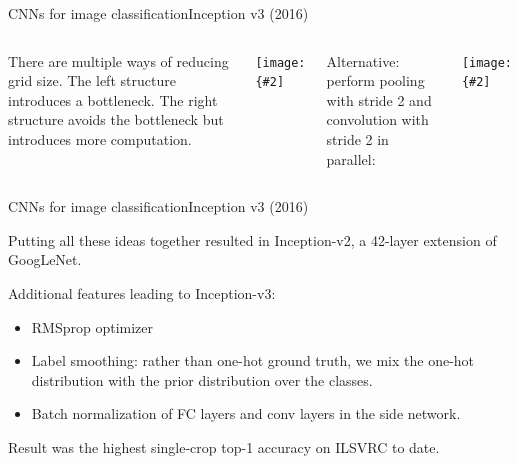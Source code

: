 \documentclass[aspectratio=169]{beamer}
\newcommand{\myfig}[3]{\centerline{\texttt{[image: \{\#2]}}}
\begin{document}
\begin{frame}{CNNs for image classification}{Inception v3 (2016)}

  \begin{columns}

  \column{2in}

  There are multiple ways of reducing grid size. The left structure
  introduces a bottleneck. The right structure avoids the bottleneck
  but introduces more computation.

  \medskip

  \myfig{1.8in}{szegedy-15-fig9}{Szegedy et al. (2016), Figure 9}

  \column{2in}

  Alternative: perform pooling with stride 2 and convolution with stride
  2 in parallel:

  \medskip

  \myfig{1.8in}{szegedy-15-fig10}{Szegedy et al. (2016), Figure 10}

  \end{columns}

\end{frame}


\begin{frame}{CNNs for image classification}{Inception v3 (2016)}

  Putting all these ideas together resulted in Inception-v2, a 42-layer
  extension of GoogLeNet.

  \medskip

  Additional features leading to Inception-v3:
  \begin{itemize}
    \item RMSprop optimizer
    \item Label smoothing: rather than one-hot ground truth, we
      mix the one-hot distribution with the prior distribution
      over the classes.
    \item Batch normalization of FC layers and conv layers in the
      side network.
  \end{itemize}

  \medskip

  Result was the highest single-crop top-1 accuracy on ILSVRC to
  date.

\end{frame}
\end{document}
